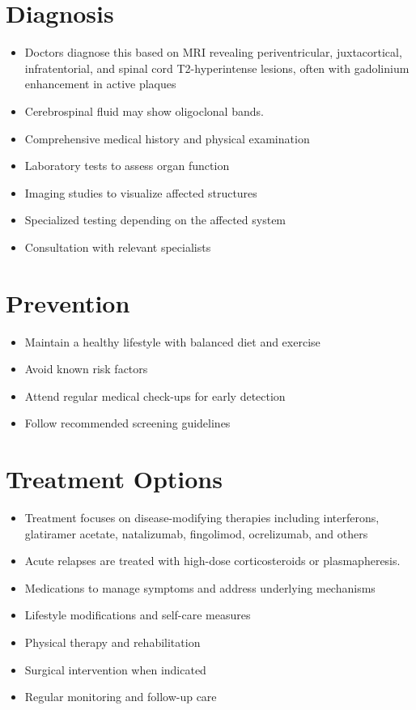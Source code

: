 \section{Diagnosis}
\begin{itemize}[noitemsep]
  \item Doctors diagnose this based on MRI revealing periventricular, juxtacortical, infratentorial, and spinal cord T2-hyperintense lesions, often with gadolinium enhancement in active plaques
  \item Cerebrospinal fluid may show oligoclonal bands.
  \item Comprehensive medical history and physical examination
  \item Laboratory tests to assess organ function
  \item Imaging studies to visualize affected structures
  \item Specialized testing depending on the affected system
  \item Consultation with relevant specialists
\end{itemize}
\section{Prevention}
\begin{itemize}[noitemsep]
  \item Maintain a healthy lifestyle with balanced diet and exercise
  \item Avoid known risk factors
  \item Attend regular medical check-ups for early detection
  \item Follow recommended screening guidelines
\end{itemize}
\section{Treatment Options}
\begin{itemize}[noitemsep]
  \item Treatment focuses on disease-modifying therapies including interferons, glatiramer acetate, natalizumab, fingolimod, ocrelizumab, and others
  \item Acute relapses are treated with high-dose corticosteroids or plasmapheresis.
  \item Medications to manage symptoms and address underlying mechanisms
  \item Lifestyle modifications and self-care measures
  \item Physical therapy and rehabilitation
  \item Surgical intervention when indicated
  \item Regular monitoring and follow-up care
\end{itemize}
